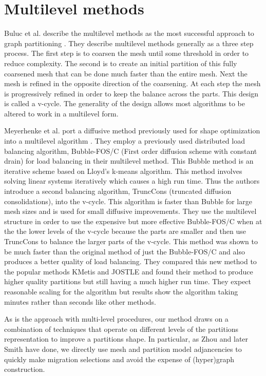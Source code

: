 \documentclass{thesis}
\begin{document}
\section{Multilevel methods}
Buluc et al. describe the multilevel methods as the most successful approach to 
graph partitioning \cite{surveygraph}. They describe multilevel methods 
generally as a three step process. The first step is to coarsen the mesh 
until some threshold in order to reduce complexity. The second is to create 
an initial partition of this fully coarsened mesh that can be done much 
faster than the entire mesh. Next the mesh is refined in the opposite direction
of the coarsening. At each step the mesh is progressively refined in order to
keep the balance across the parts. This design is called a v-cycle. The 
generality of the design allows most algorithms to be altered to work in a 
multilevel form. 

Meyerhenke et al. port a diffusive method previously used for 
shape optimization into a multilevel algorithm \cite{multidiffuse}. They 
employ a 
previously used distributed load balancing algorithm, Bubble-FOS/C (First order
diffusion scheme with constant drain) for load balancing in their multilevel
method. This Bubble method is an iterative scheme based on Lloyd's k-means 
algorithm. This method involves solving linear systems iteratively which causes 
a high run time. Thus the authors introduce a second balancing algorithm, 
TruncCons (truncated diffusion consolidations), into the v-cycle. This 
algorithm is faster than Bubble for large mesh sizes and is used for small
diffusive improvements. They use the multilevel structure in order to use 
the expensive but more effective Bubble-FOS/C when at the the lower levels of 
the v-cycle because the parts are smaller and then use TruncCons to balance the 
larger parts of the v-cycle. 
This method was shown to be much faster than the original method 
of just the Bubble-FOS/C and also produces a better quality of load balancing. 
They compared this new method to the popular methods KMetis and JOSTLE and 
found their method to produce higher quality partitions but still having a
much higher run time. They expect reasonable scaling for the algorithm but 
results show the algorithm taking minutes rather than seconds like other 
methods.

As is the approach with multi-level procedures, our method draws on a
combination of techniques that operate on different levels of the partitions 
representation to improve a partitions shape. In particular, as Zhou 
\cite{zhougraph} and later Smith \cite{parma} have done, we directly use 
mesh and partition model adjancencies to quickly make migration selections 
and avoid the expense of (hyper)graph construction.
\end{document}
